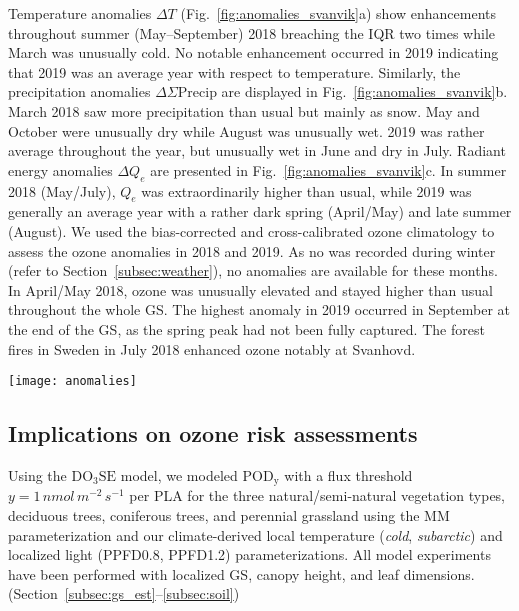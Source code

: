 \documentclass[bg, manuscript]{copernicus}
\begin{document}
Temperature anomalies $\Delta T$ (Fig.~\ref{fig:anomalies_svanvik}a) show enhancements throughout summer (May--September) 2018 breaching the IQR two times while March was unusually cold. No notable enhancement occurred in 2019 indicating that 2019 was an average year with respect to temperature. Similarly, the precipitation anomalies $\Delta\Sigma\mathrm{Precip}$ are displayed in Fig.~\ref{fig:anomalies_svanvik}b. March 2018 saw more precipitation than usual but mainly as snow. May and October were unusually dry while August was unusually wet. 2019 was rather average throughout the year, but unusually wet in June and dry in July. Radiant energy anomalies $\Delta Q_e$ are presented in Fig.~\ref{fig:anomalies_svanvik}c. In summer 2018 (May/July), $Q_e$ was extraordinarily higher than usual, while 2019 was generally an average year with a rather dark spring (April/May) and late summer (August).
We used the bias-corrected and cross-calibrated ozone climatology \citep{ACP:Falk2021} to assess the ozone anomalies in 2018 and 2019. As no \chem{[O_3]} was recorded during winter (refer to Section~\ref{subsec:weather}), no anomalies are available for these months. In April/May 2018, ozone was unusually elevated and stayed higher than usual throughout the whole GS. The highest anomaly in 2019 occurred in September at the end of the GS, as the spring peak had not been fully captured. The forest fires in Sweden in July 2018 enhanced ozone notably at Svanhovd.

\begin{figure*}[t]
  
  \centering
  \texttt{[image: anomalies]}
  \caption{2018 and 2019 anomalies of key environmental variables at Svanhovd displayed as difference from median for each month. The hatched area between indicates the IQR. (a) Temperature; (b) precipitation; (c) radiant energy; (d) ozone VMR.}
  \label{fig:anomalies_svanvik}
\end{figure*}


\subsection{Implications on ozone risk assessments}
\label{subsec:do3se_results}

Using the $\mathrm{DO_3SE}$ model, we modeled $\mathrm{POD_y}$ with a flux threshold $y=1\,\unit{nmol\,m^{-2}\,s^{-1}}$ per PLA for the three natural/semi-natural vegetation types, deciduous trees, coniferous trees, and perennial grassland using the MM parameterization and our climate-derived local temperature (\emph{cold}, \emph{subarctic}) and localized light (PPFD0.8, PPFD1.2) parameterizations. All model experiments have been performed with localized GS, canopy height, and leaf dimensions. (Section~\ref{subsec:gs_est}--\ref{subsec:soil})
\end{document}
